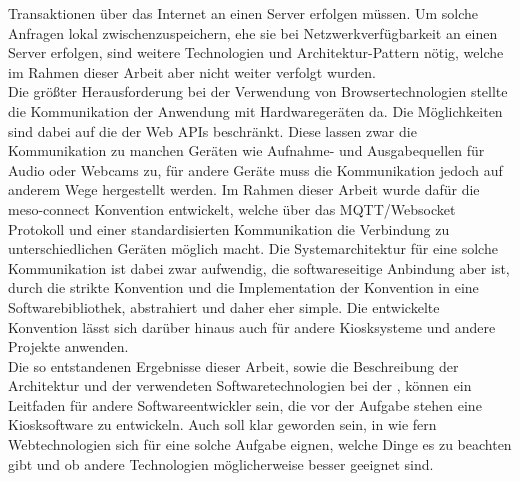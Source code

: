 Transaktionen über das Internet an einen Server erfolgen müssen. Um solche Anfragen lokal zwischenzuspeichern,
ehe sie bei Netzwerkverfügbarkeit an einen Server erfolgen, sind weitere Technologien und 
Architektur-Pattern nötig, welche im Rahmen dieser Arbeit aber nicht weiter verfolgt wurden.\\
Die größter Herausforderung bei der Verwendung von Browsertechnologien stellte die Kommunikation 
der Anwendung mit Hardwaregeräten da. 
Die Möglichkeiten sind dabei auf die der Web APIs beschränkt. Diese lassen zwar die Kommunikation zu manchen
Geräten wie Aufnahme- und Ausgabequellen für Audio oder Webcams zu, für andere Geräte muss die Kommunikation
jedoch auf anderem Wege hergestellt werden. Im Rahmen dieser Arbeit wurde dafür die meso-connect Konvention 
entwickelt, welche über das MQTT/Websocket Protokoll und einer standardisierten Kommunikation die Verbindung
zu unterschiedlichen Geräten möglich macht. Die Systemarchitektur für eine solche Kommunikation ist dabei zwar
aufwendig, die softwareseitige Anbindung aber ist, durch die strikte Konvention und die Implementation der Konvention
in eine Softwarebibliothek, abstrahiert und daher eher simple. Die entwickelte Konvention lässt sich darüber 
hinaus auch für andere Kiosksysteme und andere Projekte anwenden.\\

Die so entstandenen Ergebnisse dieser Arbeit, sowie die Beschreibung der Architektur und der verwendeten
Softwaretechnologien bei der \shst{}, können ein Leitfaden für andere Softwareentwickler sein, die 
vor der Aufgabe stehen eine Kiosksoftware zu entwickeln. Auch soll klar geworden sein, in wie fern 
Webtechnologien sich für eine solche Aufgabe eignen, welche Dinge es zu beachten gibt und ob andere
Technologien möglicherweise besser geeignet sind.

\iffalse
- Manche Anforderungen an Kiosksoftware, wie die Mulitlingualität, sind mit
Webtechnologien sehr leicht umzusetzen, da sie auch Anforderungen typischer
Webanwendungen darstellen. Technologien dafür sind vorhanden

- Geschlossen

- Vorteile:
  - Deployment ist leicht durch Hosting
  - Kein aufwendiger Build Process, lediglich statische Files
  - Lose Kopplung leicht durch PWA und Server-Client Kommunikation
  - großer Vorteil der Plattforumunabhängigkeit -- gerade bei reinen Browseranwendungen
  universelle Nutzung denkbar

- Nachteile/Probleme:
  - Hardwarekommunikation bedarf spezieller Architektur und Software
  - Geräte können nur in manchen Fällen direkt mit der Applikation kommunizieren;
  - Web APIs werden ständig weiter entwickelt -> Web USB
  - Offline Verfügbarkeit ist bei Browseranwendung und Server/Client Architektur eher 
    aufwendig. 
\fi